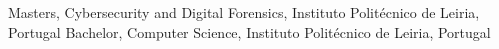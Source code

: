 %
%
%

\vspace{-0.5em}
\vspace{0.5em}
\begin{scholarship}
	{Masters, Cybersecurity and Digital Forensics, Instituto Politécnico de Leiria, Portugal}
	{Bachelor, Computer Science, Instituto Politécnico de Leiria, Portugal}
\end{scholarship}